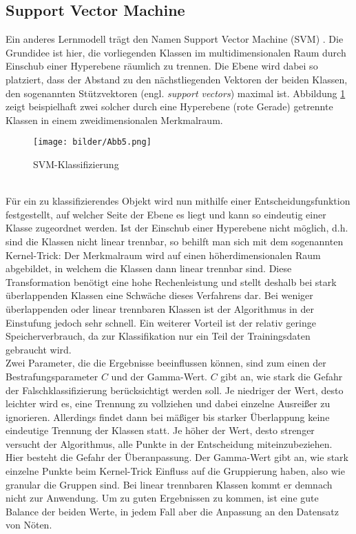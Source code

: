 \subsection{Support Vector Machine}\label{svm}
Ein anderes Lernmodell trägt den Namen Support Vector Machine (SVM) \citep{Nayak15}. Die Grundidee ist hier, die vorliegenden Klassen im multidimensionalen Raum durch Einschub einer Hyperebene räumlich zu trennen. Die Ebene wird dabei so platziert, dass der Abstand zu den nächstliegenden Vektoren der beiden Klassen, den sogenannten Stützvektoren (engl. \textit{support vectors}) maximal ist. Abbildung \ref{svm-alg} zeigt beispielhaft zwei solcher durch eine Hyperebene (rote Gerade) getrennte Klassen in einem zweidimensionalen Merkmalraum. 
\begin{figure}[htb]
	\begin{center}
		\texttt{[image: bilder/Abb5.png]}
		\caption{SVM-Klassifizierung \citep{Zhou16}}\label{svm-alg}
	\end{center}
\end{figure}\\
 Für ein zu klassifizierendes Objekt wird nun mithilfe einer Entscheidungsfunktion festgestellt, auf welcher Seite der Ebene es liegt und kann so eindeutig einer Klasse zugeordnet werden. Ist der Einschub einer Hyperebene nicht möglich, d.h. sind die Klassen nicht linear trennbar, so behilft man sich mit dem sogenannten \glqq Kernel-Trick\grqq{}: Der Merkmalraum wird auf einen höherdimensionalen Raum abgebildet, in welchem die Klassen dann linear trennbar sind. Diese Transformation benötigt eine hohe Rechenleistung und stellt deshalb bei stark überlappenden Klassen eine Schwäche dieses Verfahrens dar. Bei weniger überlappenden oder linear trennbaren Klassen ist der Algorithmus in der Einstufung jedoch sehr schnell. Ein weiterer Vorteil ist der relativ geringe Speicherverbrauch, da zur Klassifikation nur ein Teil der Trainingsdaten gebraucht wird.\\
 Zwei Parameter, die die Ergebnisse beeinflussen können, sind zum einen der Bestrafungsparameter $C$ und der Gamma-Wert. $C$ gibt an, wie stark die Gefahr der Falschklassifizierung berücksichtigt werden soll. Je niedriger der Wert, desto leichter wird es, eine Trennung zu vollziehen und dabei einzelne Ausreißer zu ignorieren. Allerdings findet dann bei mäßiger bis starker Überlappung keine eindeutige Trennung der Klassen statt. Je höher der Wert, desto strenger versucht der Algorithmus, alle Punkte in der Entscheidung miteinzubeziehen. Hier besteht die Gefahr der Überanpassung. Der Gamma-Wert gibt an, wie stark einzelne Punkte beim Kernel-Trick Einfluss auf die Gruppierung haben, also wie granular die Gruppen sind. Bei linear trennbaren Klassen kommt er demnach nicht zur Anwendung. Um zu guten Ergebnissen zu kommen, ist eine gute Balance der beiden Werte, in jedem Fall aber die Anpassung an den Datensatz von Nöten.
